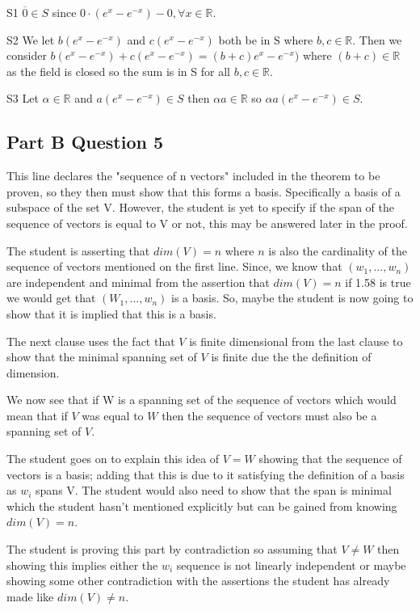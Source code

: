 \documentclass{article}
\begin{document}
S1 $\overline{0} \in S $ since $0 \cdot (e^x - e^{-x}) - 0, \forall x \in \mathbb{R}$.

S2 We let $b(e^x - e^{-x})$ and $c(e^x - e^{-x})$ both be in S where $b,c \in \mathbb{R}$. Then we consider $b(e^x - e^{-x}) + c(e^x - e^{-x}) = (b+c)e^x - e^{-x})$ where $(b+c) \in \mathbb{R}$ as the field is closed so the sum is in S for all $b,c \in \mathbb{R}$.

S3 Let $\alpha \in \mathbb{R}$ and $a (e^x - e^{-x}) \in S$ then $\alpha a \in \mathbb{R}$ so $\alpha a (e^x - e^{-x}) \in S$.




\subsection{Part B Question 5 }
This line declares the "sequence of n vectors" included in the theorem to be proven, so they then must show that this forms a basis. Specifically a basis of a subspace of the set V. However, the student is yet to specify if the span of the sequence of vectors is equal to V or not, this may be answered later in the proof.

The student is asserting that $dim(V) = n$ where $n$ is also the cardinality of the sequence of vectors mentioned on the first line. Since, we know that $(w_1,...,w_n)$ are independent and minimal from the assertion that $dim(V) = n$ if 1.58 is true we would get that $(W_1,...,w_n)$ is a basis. So, maybe the student is now going to show that it is implied that this is a basis.

The next clause uses the fact that $V$ is finite dimensional from the last clause to show that the minimal spanning set of $V$ is finite due the the definition of dimension.

We now see that if W is a spanning set of the sequence of vectors which would mean that if $V$ was equal to $W$ then the sequence of vectors must also be a spanning set of $V$.

The student goes on to explain this idea of $V=W$ showing that the sequence of vectors is a basis; adding that this is due to it satisfying the definition of a basis as $w_i$ spans V. The student would also need to show that the span is minimal which the student hasn't mentioned explicitly but can be gained from knowing $dim(V) = n$.

The student is proving this part by contradiction so assuming that $V \neq W$ then showing this implies either the $w_i$ sequence is not linearly independent or maybe showing some other contradiction with the assertions the student has already made like $dim(V) \neq n$.
\end{document}
